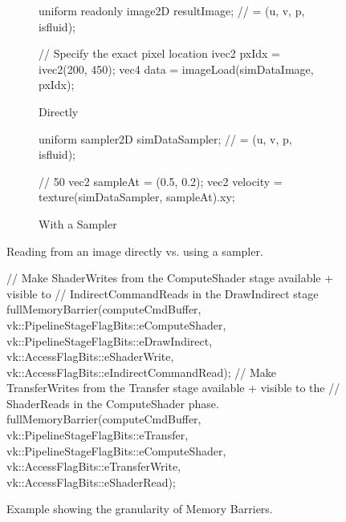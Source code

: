\begin{figure}
    \centering
     \begin{subfigure}[b]{0.49\textwidth}
         \centering
\begin{glslcode}
uniform readonly image2D resultImage;
 // = (u, v, p, isfluid);

// Specify the exact pixel location
ivec2 pxIdx = ivec2(200, 450);
vec4 data = imageLoad(simDataImage, pxIdx);
\end{glslcode}
\caption{Directly}
     \end{subfigure}
     \hfill
     \begin{subfigure}[b]{0.49\textwidth}
         \centering
\begin{glslcode}
uniform sampler2D simDataSampler;
 // = (u, v, p, isfluid);
 
// 50%
vec2 sampleAt = (0.5, 0.2);
vec2 velocity = texture(simDataSampler, sampleAt).xy;
\end{glslcode}
\caption{With a Sampler}
     \end{subfigure}
  \caption{Reading from an image directly vs. using a sampler.}
    \label{fig:VizImageRead}
\end{figure}
\begin{figure}
    \centering
    \begin{cppcode}
// Make ShaderWrites from the ComputeShader stage available + visible to 
//      IndirectCommandReads in the DrawIndirect stage
fullMemoryBarrier(computeCmdBuffer,
    vk::PipelineStageFlagBits::eComputeShader, vk::PipelineStageFlagBits::eDrawIndirect,
    vk::AccessFlagBits::eShaderWrite, vk::AccessFlagBits::eIndirectCommandRead);
// Make TransferWrites from the Transfer stage available + visible to the
//      ShaderReads in the ComputeShader phase.
fullMemoryBarrier(computeCmdBuffer,
    vk::PipelineStageFlagBits::eTransfer, vk::PipelineStageFlagBits::eComputeShader,
    vk::AccessFlagBits::eTransferWrite, vk::AccessFlagBits::eShaderRead);
    \end{cppcode}
    \caption{Example showing the granularity of Memory Barriers.}
    \label{fig:VizMemoryBarrier}
\end{figure}

